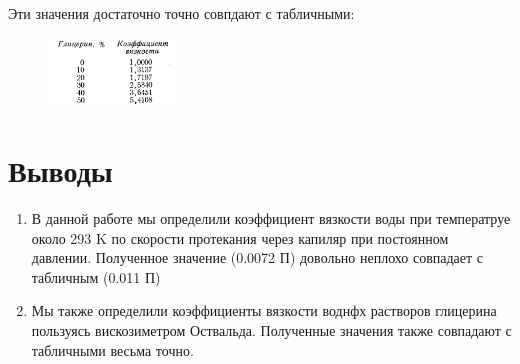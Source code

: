 \documentclass{article}
\begin{document}
Эти значения достаточно точно совпдают с табличными:

\begin{figure}[H]
    \centering
    \includegraphics[width=0.3\textwidth]{table_data.png}
\end{figure}

\section{Выводы}
\begin{enumerate}
    \item 
В данной работе мы определили коэффициент вязкости воды при температруе около 293 K
по скорости протекания через капиляр при постоянном давлении. Полученное
значение (0.0072 П) довольно неплохо совпадает с табличным (0.011 П)
    \item 
Мы также определили коэффициенты вязкости воднфх растворов глицерина пользуясь 
вискозиметром Оствальда. Полученные значения также совпадают с табличными весьма точно.
\end{enumerate}
\end{document}
